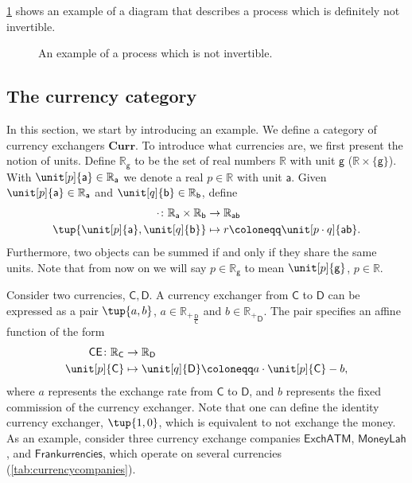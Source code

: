 \cref{fig:e10} shows an example of a diagram that describes a process which is definitely
not invertible.

\begin{figure}[h!]
    \centering
    \caption{An example of a process which is not invertible. \label{fig:e10}}
\end{figure}

\subsection{The currency category}
In this section, we start by introducing an example. We define a category of currency exchangers $\mathbf{Curr}$. To introduce what currencies are, we first present the notion of units. Define $\mathbb{R}_\mathsf{g}$ to be the set of real numbers $\mathbb{R}$ with unit $\mathsf{g}$ ($\mathbb{R}\times \{\mathsf{g}\}$). With $\unit[p]{\mathsf{a}}\in \mathbb{R}_\mathsf{a}$ we denote a real $p\in \mathbb{R}$ with unit $\mathsf{a}$. Given $\unit[p]{\mathsf{a}} \in \mathbb{R}_\mathsf{a}$ and $\unit[q]{\mathsf{b}}\in \mathbb{R}_\mathsf{b}$, define
    \begin{equation}
    \begin{aligned}
    \cdot \colon \mathbb{R}_\mathsf{a} \times \mathbb{R}_\mathsf{b} &\to \mathbb{R}_\mathsf{ab}\\
    \tup{\unit[p]{\mathsf{a}},\unit[q]{\mathsf{b}}}&\mapsto r\coloneqq \unit[p\cdot q]{\mathsf{ab}}.
    \end{aligned}
    \end{equation}
Furthermore, two objects can be summed if and only if they share the same units. Note that from now on we will say $p\in \mathbb{R}_\mathsf{g}$ to mean $\unit[p]{\mathsf{g}}$, $p\in \mathbb{R}$.

\noindent Consider two currencies, $\mathsf{C,D}$. A currency exchanger from $\mathsf{C}$ to $\mathsf{D}$ can be expressed as a pair $\tup{a,b}$, $a\in {\mathbb{R}_{+}}_ {\frac{\mathsf{D}}{\mathsf{C}}}$ and $b\in {\mathbb{R}_{+}}_ {\mathsf{D}}$. The pair specifies an affine function of the form
\begin{equation}
        \begin{aligned}
        \mathsf{CE}\colon \mathbb{R}_\mathsf{C}&\to \mathbb{R}_\mathsf{D}\\
        \unit[p]{\mathsf{C}}&\mapsto \unit[q]{\mathsf{D}} \coloneqq a\cdot \unit[p]{\mathsf{C}} -b,
        \end{aligned}
    \end{equation}
   where $a$ represents the exchange rate from $\mathsf{C}$ to $\mathsf{D}$, and $b$ represents the fixed commission of the currency exchanger. Note that one can define the identity currency exchanger, $\tup{1,0}$, which is equivalent to not exchange the money. As an example, consider three currency exchange companies $\mathsf{ExchATM}$, $\mathsf{MoneyLah}$, and $\mathsf{Frankurrencies}$, which operate on several currencies (\cref{tab:currencycompanies}).
   
